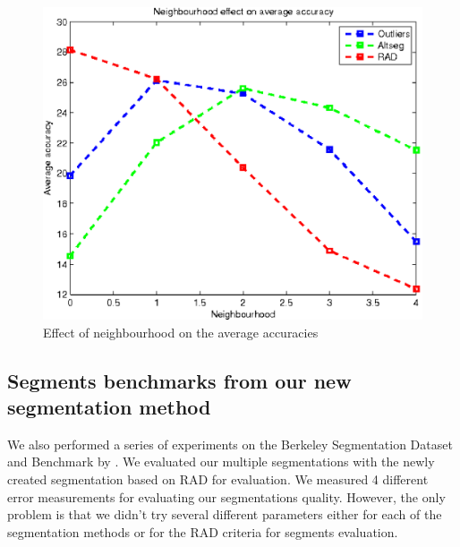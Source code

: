 \documentclass[twoside,11pt]{article}
\begin{document}
\begin{figure}
\includegraphics[scale =.65]{./Figures/neigh_mix.eps}
\centering
\caption{Effect of neighbourhood on the average accuracies}
\label{fig:mixed_bu}
\end{figure}

\subsection{Segments benchmarks from our new segmentation method}

We also performed a series of experiments on the Berkeley Segmentation Dataset and
Benchmark by \cite{MartinFTM01}. We evaluated our multiple segmentations with the
newly created segmentation based on RAD for evaluation. We measured 4 different
error measurements for evaluating our segmentations quality. However, the only
problem is that we didn't try several different parameters either for each of the
segmentation methods or for the RAD criteria for segments evaluation.
\end{document}
